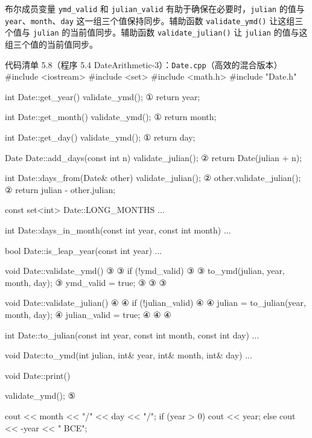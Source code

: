 布尔成员变量 \texttt{ymd\_\allowbreak{}valid} 和 \texttt{julian\_\allowbreak{}valid} 有助于确保在必要时，\texttt{julian} 的值与 \texttt{year}、\texttt{month}、\texttt{day} 这一组三个值保持同步。辅助函数 \texttt{validate\_\allowbreak{}ymd(\allowbreak{})\allowbreak{}} 让这组三个值与 \texttt{julian} 的当前值同步。辅助函数 \texttt{validate\_\allowbreak{}julian(\allowbreak{})\allowbreak{}} 让 \texttt{julian} 的值与这组三个值的当前值同步。

\begin{codeboxt}{代码清单 5.8（程序 5.4 DateArithmetic-3）：\texttt{Date.cpp}（高效的混合版本）}
#include <iostream>
#include <set>
#include <math.h>
#include "Date.h"

int Date::get_year()
{
    validate_ymd();                             ①
    return year;
}

int Date::get_month()
{
    validate_ymd();                             ①
    return month;
}

int Date::get_day()
{
    validate_ymd();                             ①
    return day;
}

Date Date::add_days(const int n)
{
    validate_julian();                          ②
    return Date(julian + n);
}

int Date::days_from(Date& other)
{
    validate_julian();                          ②
    other.validate_julian();                    ②
    return julian - other.julian;
}

const set<int> Date::LONG_MONTHS ...

int Date::days_in_month(const int year, const int month) ...

bool Date::is_leap_year(const int year) ...

void Date::validate_ymd()                       ③
{                                               ③
    if (!ymd_valid)                             ③
    {                                           ③
        to_ymd(julian, year, month, day);       ③
        ymd_valid = true;                       ③
    }                                           ③
}                                               ③

void Date::validate_julian()                    ④
{                                               ④
    if (!julian_valid)                          ④
    {                                           ④
        julian = to_julian(year, month, day);   ④
        julian_valid = true;                    ④
    }                                           ④
}                                               ④

int Date::to_julian(const int year, const int month, const int day) ...

void Date::to_ymd(int julian, int& year, int& month, int& day) ...

void Date::print()
{
    validate_ymd();                             ⑤

    cout << month << "/" << day << "/";
    if (year > 0) cout <<  year;
    else          cout << -year << " BCE";
}
\end{codeboxt}
